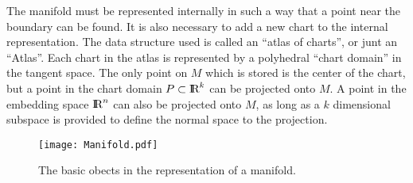 \documentclass[12pt]{article}
\def\R{\hbox{\rm I\kern-.2150em R}}
\begin{document}
The manifold must be represented internally in such a way that a point near the boundary can be found.
It is also necessary to add a new chart to the internal representation.
The data structure used is called an ``atlas of charts'', or junt an ``Atlas''. Each chart in the atlas is
represented by a polyhedral ``chart domain'' in the tangent space.  The only point on $M$ which is stored
is the center of the chart, but a point in the chart domain $P\subset\R^k$ can be projected onto $M$.
A point in the embedding space $\R^n$ can also be projected onto $M$, as long as a $k$ dimensional subspace is
provided to define the normal space to the projection.

  \begin{figure}
   \begin{center}
     \texttt{[image: Manifold.pdf]}
   \end{center}
   \caption{The basic obects in the representation of a manifold.}
  \end{figure}
\end{document}
